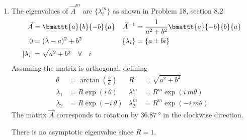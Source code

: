 \begin{enumerate}
{{{\begin{enumerate}
              \item The eigenvalues of $ \vec{A}^m $ are $ \{\lambda_i^m\} $ as shown in
                    Problem 18, section 8.2
                    \begin{align}
                        \vec{A}       & = \bmattt{a}{b}{-b}{a}                   &
                        \vec{A}^{-1}  & = \frac{1}{a^2 + b^2}
                        \bmattt{a}{-b}{b}{a}                                       \\
                        0             & = (\lambda - a)^2 + b^2                  &
                        \{\lambda_i\} & = \{a \pm bi\}                             \\
                        |\lambda_i|   & = \sqrt{a^2 + b^2} \quad \forall \quad i
                    \end{align}
                    Assuming the matrix is orthogonal, defining
                    \begin{align}
                        \theta      & = \arctan\left( \frac{b}{a} \right) &
                        R           & = \sqrt{a^2 + b^2}                    \\
                        \lambda_1   & = R\exp(i\ \theta)                  &
                        \lambda_1^m & = R^m\exp(i\ m\theta)                 \\
                        \lambda_2   & = R\exp(-i\ \theta)                 &
                        \lambda_2^m & = R^m\exp(-i\ m\theta)
                    \end{align}
                    The matrix $ \vec{A} $ corresponds to rotation by
                    $ \SI{36.87}{\degree} $ in the clockwise direction. \par
                    There is no asymptotic eigenvalue since $ R = 1 $.


\end{enumerate}}}}
\end{enumerate}
